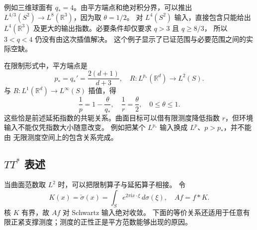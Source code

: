 \ProseParagraphBreak
例如三维球面有 \(q_*=4\)。由平方端点和绝对积分界，可以推出
\(L^{4/3}(S^2)\to L^8(\mathbb R^3)\)，因为取 \(\theta=1/2\)。
对 \(L^4(S^2)\) 输入，直接包含只能给出 \(L^4(\mathbb R^3)\)
及更大的输出指数。必要条件却仅要求 \(q>3\) 且 \(q\geq8/3\)，
所以 \(3<q<4\) 仍没有由这次插值解决。
这个例子显示了已证范围与必要范围之间的实际空缺。

\ProseParagraphBreak
在限制形式中，平方端点是
\[
 p_*=q_*'=\frac{2(d+1)}{d+3},\quad
 R:L^{p_*}(\mathbb R^d)\longrightarrow L^2(S).
\]
与 \(R:L^1(\mathbb R^d)\to L^\infty(S)\) 插值，得
\[
 \frac1p=1-\frac\theta{q_*},\quad
 \frac1r=\frac\theta2,\quad 0\leq\theta\leq1.
\]
这些恰是前述延拓指数的共轭关系。曲面目标可以借有限测度降低指数
\(r\)，但环境输入不能仅凭指数大小随意改变。
例如把某个 \(L^{p_*}\) 输入换成 \(L^p\)、\(p>p_*\)，并不能由
无限测度空间上的包含关系完成。

\subsection{\texorpdfstring{\(TT^*\)}{TT*} 表述}
\label{b2:subsec:230304}

当曲面范数取 \(L^2\) 时，可以把限制算子与延拓算子相接。
令
\[
 K(x)=\check\sigma(x)=\int_S e^{2\pi\mathrm i x\cdot\xi}\,d\sigma(\xi),
 \quad Af=f*K.
\]
核 \(K\) 有界，故 \(Af\) 对 Schwartz 输入绝对收敛。
下面的等价关系还适用于任意有限正紧支撑测度；测度的正性正是平方范数能够出现的原因。


